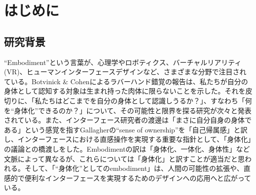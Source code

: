 \chapter{はじめに}
\label{introduction}

\section{研究背景}
\label{subject}
``Embodiment''という言葉が、心理学やロボティクス、バーチャルリアリティ(VR)、ヒューマンインターフェースデザインなど、さまざまな分野で注目されている。Botvinick \& Cohenによるラバーハンド錯覚\cite{BotvinickCohen1998}の報告は、私たちが自分の身体として認知する対象は生まれ持った肉体に限らないことを示した。それを皮切りに、「私たちはどこまでを自分の身体として認識しうるか？」、すなわち「何を``身体化''できるのか？」について、その可能性と限界を探る研究が次々と発表されている。また、インターフェース研究者の渡邊は「まさに自分自身の身体である」という感覚を指すGallagherの``sense of ownership''を「自己帰属感」と訳し、インターフェースにおける直感操作を実現する重要な指針として、「身体化」の議論との橋渡しをした。Embodimentの訳は「身体化、一体化、身体性」など文脈によって異なるが、これらについては「身体化」と訳すことが適当だと思われる。そして、「``身体化''としてのembodiment」は、人間の可能性の拡張や、直感的で便利なインターフェースを実現するためのデザインへの応用へと広がっている。






